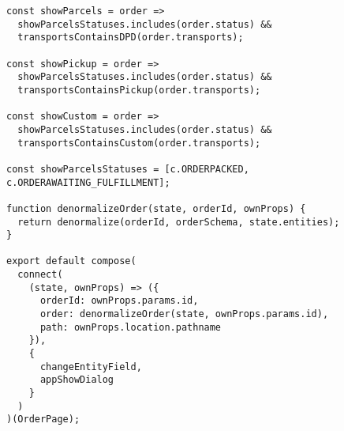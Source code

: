 \begin{lstlisting}[caption=Komponent v \JS s Redux-om, label={lst:jsComponent}]
const showParcels = order =>
  showParcelsStatuses.includes(order.status) &&
  transportsContainsDPD(order.transports);

const showPickup = order =>
  showParcelsStatuses.includes(order.status) &&
  transportsContainsPickup(order.transports);

const showCustom = order =>
  showParcelsStatuses.includes(order.status) &&
  transportsContainsCustom(order.transports);

const showParcelsStatuses = [c.ORDERPACKED, c.ORDERAWAITING_FULFILLMENT];

function denormalizeOrder(state, orderId, ownProps) {
  return denormalize(orderId, orderSchema, state.entities);
}

export default compose(
  connect(
    (state, ownProps) => ({
      orderId: ownProps.params.id,
      order: denormalizeOrder(state, ownProps.params.id),
      path: ownProps.location.pathname
    }),
    {
      changeEntityField,
      appShowDialog
    }
  )
)(OrderPage);

\end{lstlisting}